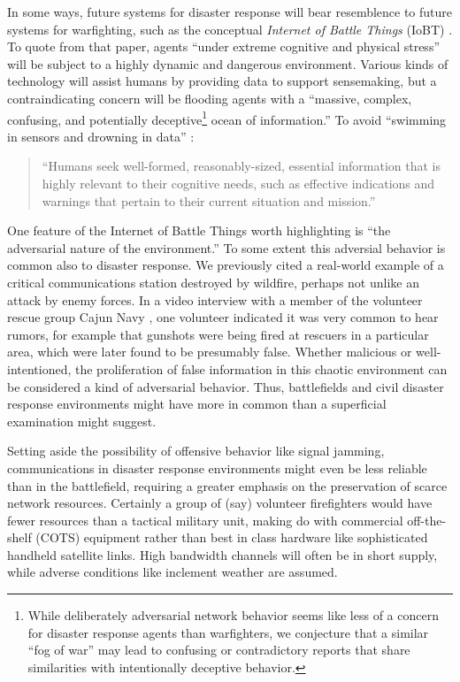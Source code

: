 \documentclass[]             %
{NASA}                       %
\theoremstyle{definition}
\begin{document}
In some ways, future systems for disaster response will bear
resemblence to future systems for warfighting, such as the conceptual
\emph{Internet of Battle Things} (IoBT) \cite{2016:iobt}. To quote from that paper,
agents ``under extreme cognitive and physical stress'' will be subject
to a highly dynamic and dangerous environment. Various kinds of
technology will assist humans by providing data to support
sensemaking, but a contraindicating concern will be flooding agents with a
``massive, complex, confusing, and potentially
deceptive\footnote{While deliberately adversarial network behavior
seems like less of a concern for disaster response agents than
warfighters, we conjecture that a similar ``fog of war'' may
lead to confusing or contradictory reports that share similarities
with intentionally deceptive behavior.} ocean of information.'' To
avoid ``swimming in sensors and drowning in data''
\cite{2010:magnuson}:
\begin{quote}
``Humans seek well-formed, reasonably-sized, essential information
  that is highly relevant to their cognitive needs, such as effective
  indications and warnings that pertain to their current situation and
  mission.'' \cite{2016:iobt}
\end{quote}

One feature of the Internet of Battle Things worth highlighting is ``the
adversarial nature of the environment.'' To some extent this adversial
behavior is common also to disaster response. We previously cited a
real-world example of a critical communications station destroyed by
wildfire, perhaps not unlike an attack by enemy forces. In a video
interview with a member of the volunteer rescue group Cajun Navy
\citationneeded, one volunteer indicated it was very common to hear
rumors, for example that gunshots were being fired at rescuers
in a particular area, which were later found to be presumably false. Whether malicious or well-intentioned, the
proliferation of false information in this chaotic environment can
be considered a kind of adversarial behavior. Thus, battlefields and civil disaster response environments might have more in common than a superficial examination might suggest.

Setting aside the possibility of offensive behavior like signal
jamming, communications in disaster response environments might even
be less reliable than in the battlefield, requiring a greater emphasis
on the preservation of scarce network resources. Certainly a group of
(say) volunteer firefighters would have fewer resources than a
tactical military unit, making do with commercial off-the-shelf (COTS)
equipment rather than best in class hardware like sophisticated
handheld satellite links. High bandwidth channels will often be in
short supply, while adverse conditions like inclement weather are
assumed.
\end{document}

